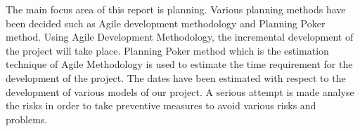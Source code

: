 
The main focus area of this report is planning. Various planning methods have been decided such as Agile development methodology and Planning Poker method.
Using Agile Development Methodology, the incremental  development of the project will take place. Planning Poker method  which is the estimation technique of Agile Methodology is used to estimate the time requirement for the development of the project. The dates have been estimated with respect to the development of various models of our project. A serious attempt is made analyse the risks  in order to take preventive measures to avoid various risks and problems. 
